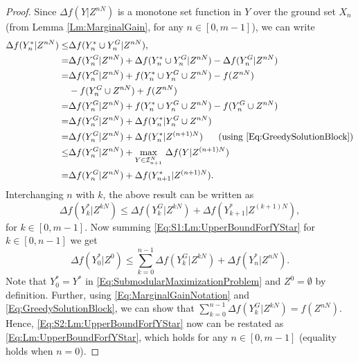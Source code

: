 \documentclass[conference]{IEEEtran}
\begin{document}
\begin{proof}
Since $\Delta f(Y \vert Z^{nN})$ is a monotone set function in $Y$ over the ground set $X_n$ (from Lemma \ref{Lm:MarginalGain}, for any $n\in[0,m-1]$), we can write 
\begin{align}
    \Delta f(Y^*_n\vert Z^{nN}) 
    \leq& \Delta f(Y^*_n\cup Y^G_n \vert Z^{nN}), \nonumber \\
    =& \Delta f(Y^G_n \vert Z^{nN}) + \Delta f(Y^*_n\cup Y^G_n \vert Z^{nN}) - \Delta f(Y^G_n \vert Z^{nN}) \nonumber \\
    =& \Delta f(Y^G_n \vert Z^{nN}) + f(Y^*_n\cup Y^G_n\cup Z^{nN}) - f(Z^{nN}) \nonumber \\
    &- f(Y^G_n \cup Z^{nN}) + f(Z^{nN}) \nonumber \\
    =& \Delta f(Y^G_n \vert Z^{nN}) + f(Y^*_n\cup Y^G_n\cup Z^{nN}) - f(Y^G_n \cup Z^{nN}) \nonumber \\
    =& \Delta f(Y^G_n \vert Z^{nN}) + \Delta f(Y^*_n \vert Y^G_n \cup Z^{nN}) \nonumber \\
    =& \Delta f(Y^G_n \vert Z^{nN}) + \Delta f(Y^*_n \vert Z^{(n+1)N}) \ \ \ \ \ \mbox{(using \eqref{Eq:GreedySolutionBlock})} \nonumber\\
    \leq& \Delta f(Y^G_n \vert Z^{nN}) + \underset{Y \in \mathcal{I}^N_{n+1}}{\max}\ \Delta f(Y \vert Z^{(n+1)N}) \nonumber\\
    =& \Delta f(Y^G_n \vert Z^{nN}) + \Delta f(Y^*_{n+1} \vert Z^{(n+1)N}).
\end{align}
Interchanging $n$ with $k$, the above result can be written as 
\begin{equation}\label{Eq:S1:Lm:UpperBoundForfYStar}
    \Delta f(Y^*_k\vert Z^{kN}) \leq \Delta f(Y^G_k\vert Z^{kN}) + \Delta f(Y^*_{k+1}\vert Z^{(k+1)N}),
\end{equation}
for $k\in[0,m-1]$. Now summing \eqref{Eq:S1:Lm:UpperBoundForfYStar} for $k\in[0,n-1]$ we get
\begin{equation}\label{Eq:S2:Lm:UpperBoundForfYStar}
    \Delta f(Y^*_0\vert Z^0) \leq \sum_{k=0}^{n-1} \Delta f(Y^G_k\vert Z^{kN}) + \Delta f(Y^*_{n}\vert Z^{nN}).
\end{equation}
Note that $Y^*_0 = Y^*$ in \eqref{Eq:SubmodularMaximizationProblem} and $Z^0=\emptyset$ by definition. Further, using \eqref{Eq:MarginalGainNotation} and \eqref{Eq:GreedySolutionBlock}, we can show that $\sum_{k=0}^{n-1} \Delta f(Y^G_k\vert Z^{kN}) = f(Z^{nN})$. Hence, \eqref{Eq:S2:Lm:UpperBoundForfYStar} now can be restated as \eqref{Eq:Lm:UpperBoundForfYStar}, which holds for any $n\in[0,m-1]$ (equality holds when $n=0$). 
\end{proof}
\end{document}
